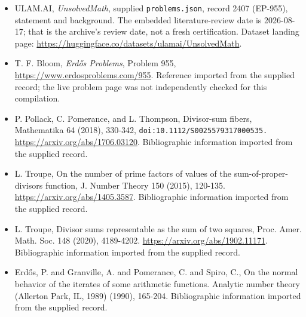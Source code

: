 \documentclass[11pt,a4paper]{article}
\begin{document}
{\small

\begin{itemize}

\item[\hypertarget{source:2407:1}{S1}] ULAM.AI, \emph{UnsolvedMath}, supplied \texttt{problems.json}, record 2407 (EP-955), statement and background. The embedded literature-review date is 2026-08-17; that is the archive’s review date, not a fresh certification. Dataset landing page: \url{https://huggingface.co/datasets/ulamai/UnsolvedMath}.

\item[\hypertarget{source:2407:2}{S2}] T. F. Bloom, \emph{Erdős Problems}, Problem 955, \url{https://www.erdosproblems.com/955}. Reference imported from the supplied record; the live problem page was not independently checked for this compilation.

\item[\hypertarget{source:2407:3}{S3}] P. Pollack, C. Pomerance, and L. Thompson, Divisor-sum fibers, Mathematika 64 (2018), 330-342, \nolinkurl{doi:10.1112/S0025579317000535.} \url{https://arxiv.org/abs/1706.03120}. Bibliographic information imported from the supplied record.

\item[\hypertarget{source:2407:4}{S4}] L. Troupe, On the number of prime factors of values of the sum-of-proper-divisors function, J. Number Theory 150 (2015), 120-135. \url{https://arxiv.org/abs/1405.3587}. Bibliographic information imported from the supplied record.

\item[\hypertarget{source:2407:5}{S5}] L. Troupe, Divisor sums representable as the sum of two squares, Proc. Amer. Math. Soc. 148 (2020), 4189-4202. \url{https://arxiv.org/abs/1902.11171}. Bibliographic information imported from the supplied record.

\item[\hypertarget{source:2407:6}{S6}] Erd\H{o}s, P. and Granville, A. and Pomerance, C. and Spiro, C., On the normal behavior of the iterates of some arithmetic functions. Analytic number theory (Allerton Park, IL, 1989) (1990), 165-204. Bibliographic information imported from the supplied record.

\end{itemize}

}

\label{end:2407}
\end{document}
